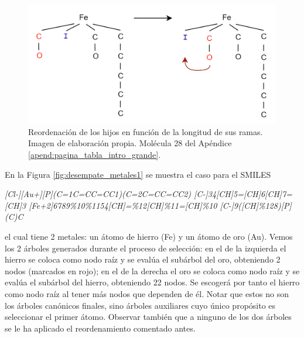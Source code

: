 \begin{figure}[h!]
    \centering
    \includegraphics[scale=0.4]{imagenes/diseno/canonizado/rearrange.png}
    \caption{Reordenación de los hijos en función de la longitud de sus ramas. Imagen de elaboración propia. Molécula 28 del Apéndice \ref{apend:pagina_tabla_intro_grande}.}
    \label{fig:rearrangeTree}
\end{figure}

En la Figura \ref{fig:desempate_metales1} se muestra el caso para el SMILES 

\begin{center}
\textit{[Cl-][Au+][P](C=1C=CC=CC1)(C=2C=CC=CC2) [C-]34[CH]5=[CH]6[CH]7=[CH]3 [Fe+2]6789\%10\%1154[CH]=\%12[CH]\%11=[CH]\%10 [C-]9([CH]\%128)[P](C)C}
    
\end{center}

el cual tiene 2 metales: un átomo de hierro (Fe) y un átomo de oro (Au). Vemos los 2 árboles generados durante el proceso de selección: en el de la izquierda el hierro se coloca como nodo raíz y se evalúa el subárbol del oro, obteniendo 2 nodos (marcados en rojo); en el de la derecha el oro se coloca como nodo raíz y se evalúa el subárbol del hierro, obteniendo 22 nodos. Se escogerá por tanto el hierro como nodo raíz al tener más nodos que dependen de él. Notar que estos no son los árboles canónicos finales, sino árboles auxiliares cuyo único propósito es seleccionar el primer átomo. Observar también que a ninguno de los dos árboles se le ha aplicado el reordenamiento comentado antes.


